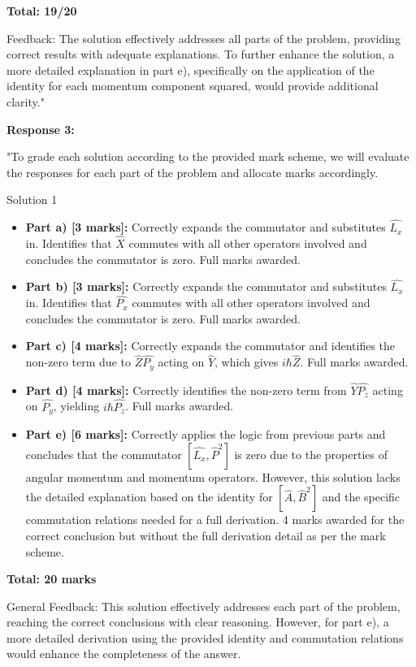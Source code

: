 \documentclass[a4paper,11pt]{article}
\begin{document}
\textbf{Total: 19/20}

Feedback: The solution effectively addresses all parts of the problem, providing correct results with adequate explanations. To further enhance the solution, a more detailed explanation in part e), specifically on the application of the identity for each momentum component squared, would provide additional clarity."

\textbf{Response 3:}

"To grade each solution according to the provided mark scheme, we will evaluate the responses for each part of the problem and allocate marks accordingly.

Solution 1

\begin{itemize}
    \item \textbf{Part a) [3 marks]:} Correctly expands the commutator and substitutes \( \hat{L_{x}} \) in. Identifies that \( \hat{X} \) commutes with all other operators involved and concludes the commutator is zero. Full marks awarded.
    \item \textbf{Part b) [3 marks]:} Correctly expands the commutator and substitutes \( \hat{L_{x}} \) in. Identifies that \( \hat{P_{x}} \) commutes with all other operators involved and concludes the commutator is zero. Full marks awarded.
    \item \textbf{Part c) [4 marks]:} Correctly expands the commutator and identifies the non-zero term due to \( \hat{Z}\hat{P_{y}} \) acting on \( \hat{Y} \), which gives \( i\hbar\hat{Z} \). Full marks awarded.
    \item \textbf{Part d) [4 marks]:} Correctly identifies the non-zero term from \( \hat{Y}\hat{P_{z}} \) acting on \( \hat{P_{y}} \), yielding \( i\hbar\hat{P_{z}} \). Full marks awarded.
    \item \textbf{Part e) [6 marks]:} Correctly applies the logic from previous parts and concludes that the commutator \( \left[ \hat{L_{x}}, \hat{P}^{2} \right] \) is zero due to the properties of angular momentum and momentum operators. However, this solution lacks the detailed explanation based on the identity for \( [\hat{A}, \hat{B}^2] \) and the specific commutation relations needed for a full derivation. 4 marks awarded for the correct conclusion but without the full derivation detail as per the mark scheme.
\end{itemize}

\textbf{Total: 20 marks}

General Feedback: This solution effectively addresses each part of the problem, reaching the correct conclusions with clear reasoning. However, for part e), a more detailed derivation using the provided identity and commutation relations would enhance the completeness of the answer.
\end{document}
